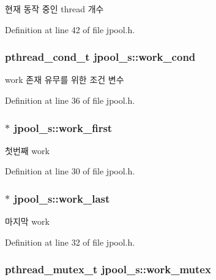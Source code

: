 현재 동작 중인 thread 개수 



Definition at line 42 of file jpool.\-h.

\hypertarget{structjpool__s_ac76152a46045dbba3e0a33e8b7e3e71b}{
\subsubsection[{work\-\_\-cond}]{\setlength{\rightskip}{0pt plus 5cm}pthread\-\_\-cond\-\_\-t jpool\-\_\-s\-::work\-\_\-cond}}\label{structjpool__s_ac76152a46045dbba3e0a33e8b7e3e71b}


work 존재 유무를 위한 조건 변수 



Definition at line 36 of file jpool.\-h.

\hypertarget{structjpool__s_aa2625fbb89fc87f0cb418649d26ea4c0}{
\subsubsection[{work\-\_\-first}]{$\ast$ jpool\-\_\-s\-::work\-\_\-first}}\label{structjpool__s_aa2625fbb89fc87f0cb418649d26ea4c0}


첫번째 work 



Definition at line 30 of file jpool.\-h.

\hypertarget{structjpool__s_a12a7e1581bce36aadf5834fb10740ffb}{
\subsubsection[{work\-\_\-last}]{$\ast$ jpool\-\_\-s\-::work\-\_\-last}}\label{structjpool__s_a12a7e1581bce36aadf5834fb10740ffb}


마지막 work 



Definition at line 32 of file jpool.\-h.

\hypertarget{structjpool__s_a726c4fc88db49d0ed13ac37252fafc57}{
\subsubsection[{work\-\_\-mutex}]{\setlength{\rightskip}{0pt plus 5cm}pthread\-\_\-mutex\-\_\-t jpool\-\_\-s\-::work\-\_\-mutex}}\label{structjpool__s_a726c4fc88db49d0ed13ac37252fafc57}


